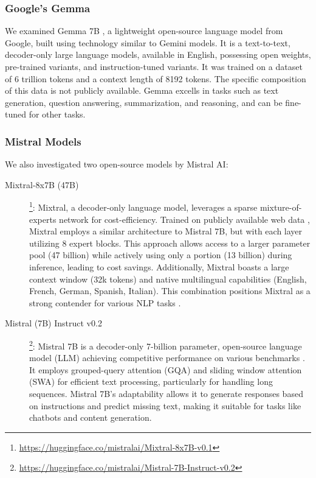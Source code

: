  
\subsubsection{Google's Gemma}

We examined Gemma 7B \parencite{gemma_2024, gemma}, a lightweight open-source language model from Google, built using technology similar to Gemini models. It is a text-to-text, decoder-only large language models, available in English, possessing open weights, pre-trained variants, and instruction-tuned variants. It was trained on a dataset of 6 trillion tokens and a context length of 8192 tokens. The specific composition of this data is not publicly available. Gemma excells in tasks such as text generation, question answering, summarization, and reasoning, and can be fine-tuned for other tasks.


\subsubsection{Mistral Models}

We also investigated two open-source models by Mistral AI:

\begin{description}
    \item[\hspace{=2em}Mixtral-8x7B (47B)]\footnote{\href{https://huggingface.co/mistralai/Mixtral-8x7B-v0.1}{https://huggingface.co/mistralai/Mixtral-8x7B-v0.1}}: Mixtral, a decoder-only language model, leverages a sparse mixture-of-experts network for cost-efficiency. Trained on publicly available web data \parencite{mixtral}, Mixtral employs a similar architecture to Mistral 7B, but with each layer utilizing 8 expert blocks. This approach allows access to a larger parameter pool (47 billion) while actively using only a portion (13 billion) during inference, leading to cost savings. Additionally, Mixtral boasts a large context window (32k tokens) and native multilingual capabilities (English, French, German, Spanish, Italian). This combination positions Mixtral as a strong contender for various NLP tasks \parencite{jiang2024mixtral}.
    \item[\hspace{=2em}Mistral (7B) Instruct v0.2]\footnote{\href{https://huggingface.co/mistralai/Mistral-7B-Instruct-v0.2}{https://huggingface.co/mistralai/Mistral-7B-Instruct-v0.2}}: Mistral 7B is a decoder-only 7-billion parameter, open-source language model (LLM) achieving competitive performance on various benchmarks \parencite{mistral, jiang2023mistral}. It employs grouped-query attention (GQA) and sliding window attention (SWA) for efficient text processing, particularly for handling long sequences. Mistral 7B's adaptability allows it to generate responses based on instructions and predict missing text, making it suitable for tasks like chatbots and content generation.
    \end{description}

